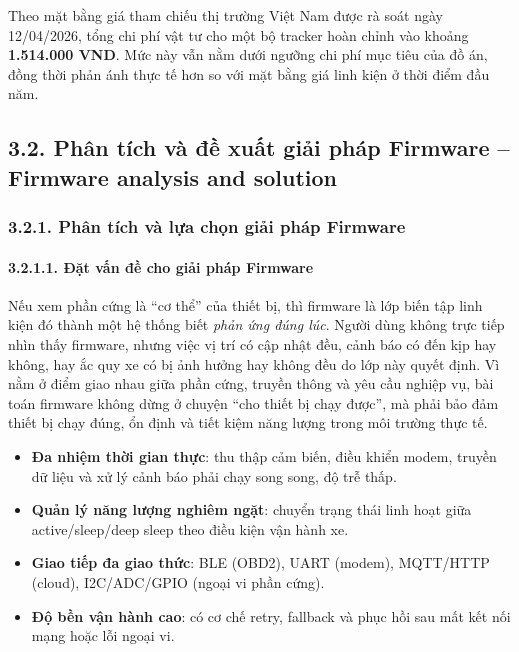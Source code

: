\documentclass[a4paper]{extarticle}
\providecommand{\tightlist}{%
  \setlength{\itemsep}{0pt}\setlength{\parskip}{0pt}}
\begin{document}
Theo mặt bằng giá tham chiếu thị trường Việt Nam được rà soát ngày
12/04/2026, tổng chi phí vật tư cho một bộ tracker hoàn chỉnh vào khoảng
\textbf{1.514.000 VND}. Mức này vẫn nằm dưới ngưỡng chi phí mục tiêu của
đồ án, đồng thời phản ánh thực tế hơn so với mặt bằng giá linh kiện ở
thời điểm đầu năm.

\subsection{3.2. Phân tích và đề xuất giải pháp Firmware -- Firmware
analysis and solution}\label{32-ux111ux1ec1-xuux1ea5t-cuxe1c-giux1ea3i-phuxe1p--proposed-solutions}

\subsubsection{3.2.1. Phân tích và lựa chọn giải pháp Firmware}

\paragraph{3.2.1.1. Đặt vấn đề cho giải pháp
Firmware}\label{3121-ux111ux1eb7t-vux1ea5n-ux111ux1ec1-cho-giux1ea3i-phuxe1p-firmware}

Nếu xem phần cứng là ``cơ thể'' của thiết bị, thì firmware là lớp biến
tập linh kiện đó thành một hệ thống biết \emph{phản ứng đúng lúc}. Người
dùng không trực tiếp nhìn thấy firmware, nhưng việc vị trí có cập nhật
đều, cảnh báo có đến kịp hay không, hay ắc quy xe có bị ảnh hưởng hay
không đều do lớp này quyết định. Vì nằm ở điểm giao nhau giữa phần cứng,
truyền thông và yêu cầu nghiệp vụ, bài toán firmware không dừng ở chuyện
``cho thiết bị chạy được'', mà phải bảo đảm thiết bị chạy đúng, ổn định
và tiết kiệm năng lượng trong môi trường thực tế.

\begin{itemize}
\tightlist
\item
  \textbf{Đa nhiệm thời gian thực}: thu thập cảm biến, điều khiển modem,
  truyền dữ liệu và xử lý cảnh báo phải chạy song song, độ trễ thấp.
\item
  \textbf{Quản lý năng lượng nghiêm ngặt}: chuyển trạng thái linh hoạt
  giữa active/sleep/deep sleep theo điều kiện vận hành xe.
\item
  \textbf{Giao tiếp đa giao thức}: BLE (OBD2), UART (modem), MQTT/HTTP
  (cloud), I2C/ADC/GPIO (ngoại vi phần cứng).
\item
  \textbf{Độ bền vận hành cao}: có cơ chế retry, fallback và phục hồi
  sau mất kết nối mạng hoặc lỗi ngoại vi.
\end{itemize}
\end{document}
